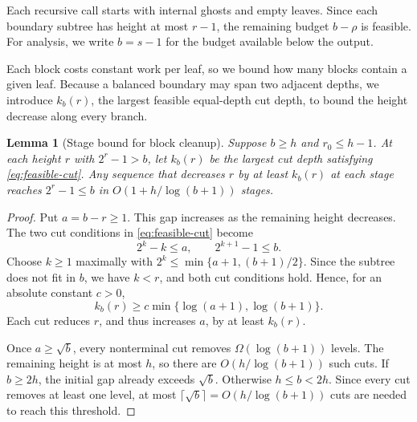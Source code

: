 \documentclass[11pt]{article}
\newtheorem{lemma}[lemma]{Lemma}
\theoremstyle{definition}
\theoremstyle{remark}
\begin{document}
Each recursive call starts with internal ghosts and empty leaves. Since each boundary subtree has height at most $r-1$, the remaining budget $b-\rho$ is feasible. For analysis, we write $b=s-1$ for the budget available below the output.

Each block costs constant work per leaf, so we bound how many blocks contain a given leaf. Because a balanced boundary may span two adjacent depths, we introduce $k_b(r)$, the largest feasible equal-depth cut depth, to bound the height decrease along every branch.

\begin{lemma}[Stage bound for block cleanup]
\label{lem:slack}
Suppose $b\ge h$ and $r_0\le h-1$. At each height $r$ with $2^r-1>b$, let $k_b(r)$ be the largest cut depth satisfying \cref{eq:feasible-cut}. Any sequence that decreases $r$ by at least $k_b(r)$ at each stage reaches $2^r-1\le b$ in $O(1+h/\log(b+1))$ stages.
\end{lemma}
\begin{proof}
Put $a=b-r\ge1$. This gap increases as the remaining height decreases. The two cut conditions in \cref{eq:feasible-cut} become
\[
2^k-k\le a,\qquad 2^{k+1}-1\le b.
\]
Choose $k\ge1$ maximally with $2^k\le\min\{a+1,(b+1)/2\}$. Since the subtree does not fit in $b$, we have $k<r$, and both cut conditions hold. Hence, for an absolute constant $c>0$,
\[
 k_b(r)\ge c\min\{\log(a+1),\log(b+1)\}.
\]
Each cut reduces $r$, and thus increases $a$, by at least $k_b(r)$.

Once $a\ge\sqrt b$, every nonterminal cut removes $\Omega(\log(b+1))$ levels. The remaining height is at most $h$, so there are $O(h/\log(b+1))$ such cuts. If $b\ge2h$, the initial gap already exceeds $\sqrt b$. Otherwise $h\le b<2h$. Since every cut removes at least one level, at most $\lceil\sqrt b\rceil=O(h/\log(b+1))$ cuts are needed to reach this threshold.
\end{proof}
\end{document}
